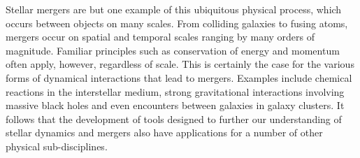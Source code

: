 Stellar mergers are but one example of this ubiquitous
physical process, which occurs between objects on many scales.
From colliding galaxies to fusing atoms,
mergers occur on spatial and temporal scales ranging by
many orders of magnitude.  Familiar principles such as conservation of
energy and momentum often apply, however, regardless of scale.  
This is certainly the case for the various forms of dynamical
interactions that lead to mergers.  
Examples include chemical reactions in the interstellar medium, strong
gravitational interactions involving massive black holes and even 
encounters between galaxies in galaxy clusters.  
It follows that the development of tools designed to further
our understanding of stellar dynamics and mergers also have
applications for a number of other physical sub-disciplines.
%
%


